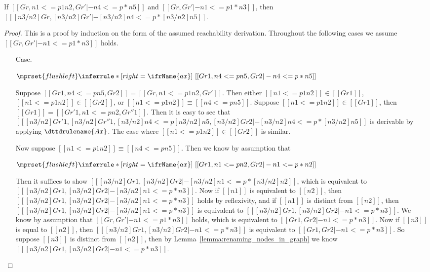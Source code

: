 \begin{lemma}
  \label{lemma:node_substitution_for_reachability}
  If $[[Gr, n1 <=p1 n2,Gr' |-n4 <=p* n5]]$ and $[[Gr, Gr' |- n1 <=p1* n3]]$, then 
  $[[ [n3/n2]Gr,[n3/n2]Gr' |- [n3/n2]n4 <=p* [n3/n2]n5]]$. 
\end{lemma}
\begin{proof}
  This is a proof by induction on the form of the assumed reachability
  derivation.  Throughout the following cases we assume $[[Gr, Gr' |-
  n1 <=p1* n3]]$ holds.
  
  \begin{itemize}
  \item[Case.]\ \\ 
    \begin{center}
      \begin{math}
        $$\mprset{flushleft}
        \inferrule* [right=\ifrName{ax}] {
          \ 
        }{[[Gr1 , n4 <= p n5 , Gr2 |- n4 <= p * n5]]}
      \end{math}
    \end{center}
    Suppose $[[Gr1, n4 <= p n5, Gr2]] = [[Gr, n1 <=p1 n2,Gr']]$.  Then
    either $[[n1 <=p1 n2]] \in [[Gr1]]$, $[[n1 <=p1 n2]] \in [[Gr2]]$,
    or $[[n1 <=p1 n2]] \equiv [[n4 <=p n5]]$.  Suppose $[[n1 <=p1 n2]] \in [[Gr1]]$,
    then $[[Gr1]] = [[Gr'1, n1 <=p n2,Gr''1]]$.  Then it is easy to see that
    $[[ [n3/n2]Gr'1,[n3/n2]Gr''1 , [n3/n2]n4 <= p [n3/n2]n5 , [n3/n2]Gr2 |- [n3/n2]n4 <= p * [n3/n2]n5]]$
    is derivable by applying $\dttdrulename{Ax}$.  The case where $[[n1 <=p1 n2]] \in [[Gr2]]$ is
    similar.

    Now suppose $[[n1 <=p1 n2]] \equiv [[n4 <=p n5]]$.  Then we know by assumption that 
    \begin{center}
      \begin{math}
        $$\mprset{flushleft}
        \inferrule* [right=\ifrName{ax}] {
          \ 
        }{[[Gr1 , n1 <= p n2 , Gr2 |- n1 <= p * n2]]}
      \end{math}
    \end{center}
    Then it suffices to show $[[ [n3/n2]Gr1 , [n3/n2]Gr2 |- [n3/n2]n1 <= p * [n3/n2]n2]]$, which is equivalent
    to $[[ [n3/n2]Gr1 , [n3/n2]Gr2 |- [n3/n2]n1 <= p * n3]]$.  Now if $[[n1]]$ is equivalent to $[[n2]]$, then
    $[[ [n3/n2]Gr1 , [n3/n2]Gr2 |- [n3/n2]n1 <= p * n3]]$ holds by reflexivity, and if $[[n1]]$ is distinct from $[[n2]]$,
    then $[[ [n3/n2]Gr1 , [n3/n2]Gr2 |- [n3/n2]n1 <= p * n3]]$ is equivalent to 
    $[[ [n3/n2]Gr1 , [n3/n2]Gr2 |- n1 <= p * n3]]$.  We know by assumption that $[[Gr, Gr' |- n1 <=p1* n3]]$ holds, which
    is equivalent to $[[Gr1, Gr2 |- n1 <=p* n3]]$.  Now if $[[n3]]$ is equal to $[[n2]]$, then 
    $[[ [n3/n2]Gr1 , [n3/n2]Gr2 |- n1 <= p * n3]]$ is equivalent to $[[Gr1, Gr2 |- n1 <=p* n3]]$.  So suppose
    $[[n3]]$ is distinct from $[[n2]]$, then by Lemma~\ref{lemma:renaming_nodes_in_graph} we know 
    $[[ [n3/n2]Gr1 , [n3/n2]Gr2 |- n1 <= p * n3]]$.        
    

\end{itemize}
\end{proof}
